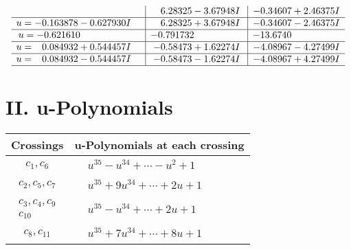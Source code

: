 \documentclass[1p]{elsarticle_modified}
\theoremstyle{definition}
\begin{document}
$$\begin{array}{c|c|c}
 & \phantom{-}6.28325 - 3.67948 I & -0.34607 + 2.46375 I \\ \hline\begin{aligned}
u &= -0.163878 - 0.627930 I\end{aligned}
 & \phantom{-}6.28325 + 3.67948 I & -0.34607 - 2.46375 I \\ \hline\begin{aligned}
u &= -0.621610\phantom{ +0.000000I}\end{aligned}
 & -0.791732\phantom{ +0.000000I} & -13.6740\phantom{ +0.000000I} \\ \hline\begin{aligned}
u &= \phantom{-}0.084932 + 0.544457 I\end{aligned}
 & -0.58473 + 1.62274 I & -4.08967 - 4.27499 I \\ \hline\begin{aligned}
u &= \phantom{-}0.084932 - 0.544457 I\end{aligned}
 & -0.58473 - 1.62274 I & -4.08967 + 4.27499 I\\
 \hline 
 \end{array}$$\newpage
\newpage\renewcommand{\arraystretch}{1}
\centering \section*{ II. u-Polynomials}
\begin{tabular}{m{50pt}|m{274pt}}
Crossings & \hspace{64pt}u-Polynomials at each crossing \\
\hline $$\begin{aligned}c_{1},c_{6}\end{aligned}$$&$\begin{aligned}
&u^{35}- u^{34}+\cdots- u^2+1
\end{aligned}$\\
\hline $$\begin{aligned}c_{2},c_{5},c_{7}\end{aligned}$$&$\begin{aligned}
&u^{35}+9 u^{34}+\cdots+2 u+1
\end{aligned}$\\
\hline $$\begin{aligned}c_{3},c_{4},c_{9}\\c_{10}\end{aligned}$$&$\begin{aligned}
&u^{35}- u^{34}+\cdots+2 u+1
\end{aligned}$\\
\hline $$\begin{aligned}c_{8},c_{11}\end{aligned}$$&$\begin{aligned}
&u^{35}+7 u^{34}+\cdots+8 u+1
\end{aligned}$\\
\hline
\end{tabular}\newpage\renewcommand{\arraystretch}{1}
\end{document}
